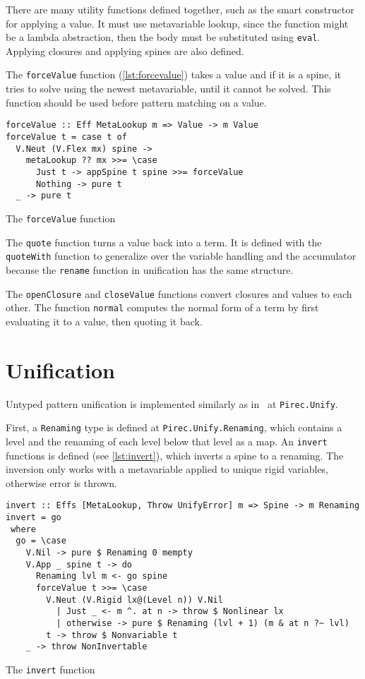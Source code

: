 There are many utility functions defined together, such as the smart constructor
for applying a value. It must use metavariable lookup, since the function might
be a lambda abstraction, then the body must be substituted using
\texttt{eval}. Applying closures and applying spines are also defined.

The \texttt{forceValue} function (\cref{lst:forcevalue}) takes a value
and if it is a spine, it tries to solve using the newest metavariable, until it
cannot be solved. This function should be used before pattern matching on a
value.

\begin{listing}
  \begin{verbatim}
forceValue :: Eff MetaLookup m => Value -> m Value
forceValue t = case t of
  V.Neut (V.Flex mx) spine ->
    metaLookup ?? mx >>= \case
      Just t -> appSpine t spine >>= forceValue
      Nothing -> pure t
  _ -> pure t
  \end{verbatim}
  \caption{The \texttt{forceValue} function}\label{lst:forcevalue}
\end{listing}

The \texttt{quote} function turns a value back into a term. It is
defined with the \texttt{quoteWith} function to generalize over the
variable handling and the accumulator because the \texttt{rename}
function in unification has the same structure.

The \texttt{openClosure} and \texttt{closeValue} functions
convert closures and values to each other. The function \texttt{normal}
computes the normal form of a term by first evaluating it to a value, then
quoting it back.

\section{Unification}\label{sec:unify}

Untyped pattern unification is implemented similarly as in~\cite{elabzoo} at
\texttt{Pirec.Unify}.

First, a \texttt{Renaming} type is defined at
\texttt{Pirec.Unify.Renaming}, which contains a level and the renaming of each
level below that level as a map. An \texttt{invert} functions is defined
(see \cref{lst:invert}), which inverts a spine to a renaming. The inversion only
works with a metavariable applied to unique rigid variables, otherwise error is
thrown.

\begin{listing}
  \begin{verbatim}
invert :: Effs [MetaLookup, Throw UnifyError] m => Spine -> m Renaming
invert = go
 where
  go = \case
    V.Nil -> pure $ Renaming 0 mempty
    V.App _ spine t -> do
      Renaming lvl m <- go spine
      forceValue t >>= \case
        V.Neut (V.Rigid lx@(Level n)) V.Nil
          | Just _ <- m ^. at n -> throw $ Nonlinear lx
          | otherwise -> pure $ Renaming (lvl + 1) (m & at n ?~ lvl)
        t -> throw $ Nonvariable t
    _ -> throw NonInvertable
  \end{verbatim}
  \caption{The \texttt{invert} function}\label{lst:invert}
\end{listing}

